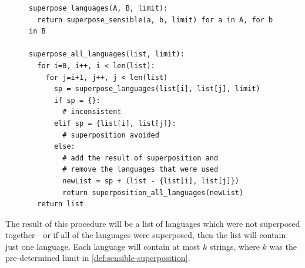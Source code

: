 \documentclass[a4paper,12pt,leqno]{article}
\begin{document}
\begin{center}
\begin{figure}[h!]
\begin{verbatim}	
superpose_languages(A, B, limit):
  return superpose_sensible(a, b, limit) for a in A, for b in B

superpose_all_languages(list, limit):
  for i=0, i++, i < len(list):
    for j=i+1, j++, j < len(list)
      sp = superpose_languages(list[i], list[j], limit)
      if sp = {}:
        # inconsistent
      elif sp = {list[i], list[j]}:
        # superposition avoided
      else:
        # add the result of superposition and
        # remove the languages that were used
        newList = sp + (list - {list[i], list[j]})
        return superposition_all_languages(newList)
  return list
\end{verbatim}
\end{figure}
\label{fig:pseudo-code-spsens}
\end{center}
The result of this procedure will be a list of languages which were not superposed together---or if all of the languages were superposed, then the list will contain just one language. Each language will contain at most $k$ strings, where $k$ was the pre-determined limit in \cref{def:sensible-superposition}.
\end{document}
